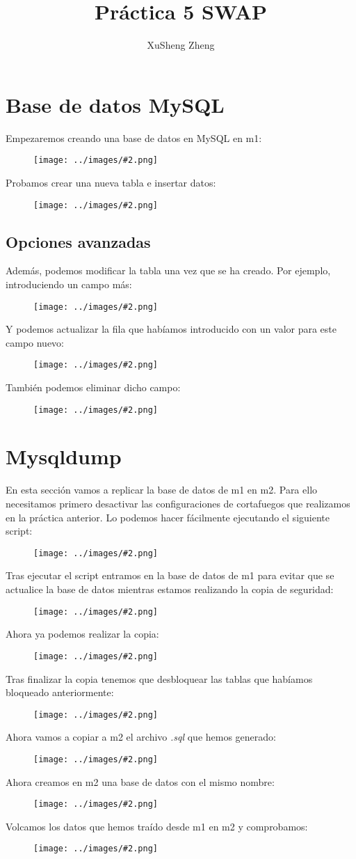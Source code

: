 \documentclass[twoside]{article}
\title{Práctica 5 SWAP}
\author{XuSheng Zheng}
\date{}
\newcommand{\image}[2]{
\begin{figure}[H]
    \texttt{[image: ../images/\#2.png]}
    \centering
\end{figure}
}
\begin{document}
\maketitle
\tableofcontents
\newpage

\section{Base de datos MySQL}
Empezaremos creando una base de datos en MySQL en m1:
\image{10}{1}
Probamos crear una nueva tabla e insertar datos:
\image{10}{2}

\subsection{Opciones avanzadas}
Además, podemos modificar la tabla una vez que se ha creado. Por ejemplo, introduciendo un campo más:
\image{10}{3}
Y podemos actualizar la fila que habíamos introducido con un valor para este campo nuevo:
\image{10}{4}
También podemos eliminar dicho campo:
\image{10}{5}

\section{Mysqldump}
En esta sección vamos a replicar la base de datos de m1 en m2. Para ello necesitamos primero desactivar las configuraciones de cortafuegos que realizamos en la práctica anterior. Lo podemos hacer fácilmente ejecutando el siguiente script:
\image{6}{6}
Tras ejecutar el script entramos en la base de datos de m1 para evitar que se actualice la base de datos mientras estamos realizando la copia de seguridad:
\image{10}{7}
Ahora ya podemos realizar la copia:
\image{10}{8}
Tras finalizar la copia tenemos que desbloquear las tablas que habíamos bloqueado anteriormente:
\image{10}{9}
Ahora vamos a copiar a m2 el archivo \textit{.sql} que hemos generado:
\image{10}{10}
Ahora creamos en m2 una base de datos con el mismo nombre:
\image{10}{11}
Volcamos los datos que hemos traído desde m1 en m2 y comprobamos:
\image{10}{12}
\end{document}
